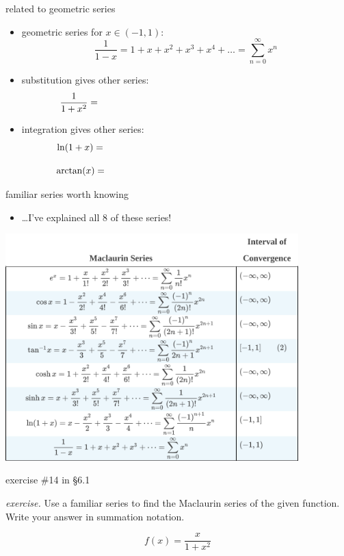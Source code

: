 \documentclass[dvipsnames,colorlinks]{beamer}
\begin{document}
\begin{frame}{related to geometric series}

\begin{itemize}
\item geometric series for $x\in(-1,1)$:
    $$\frac{1}{1-x} = 1 + x + x^2 + x^3 + x^4 + \dots = \sum_{n=0}^\infty x^n$$
\item substitution gives other series:
   $$\frac{1}{1+x^2} = \hspace{80mm}$$

\bigskip
\item integration gives other series:
   $$\ln(1+x) = \hspace{80mm}$$

   $$\arctan(x) = \hspace{80mm}$$

\bigskip
\end{itemize}
\end{frame}


\begin{frame}{familiar series worth knowing}

\begin{itemize}
\item \dots I've explained all 8 of these series!
\end{itemize}


\hspace{10mm}\includegraphics[width=0.85\textwidth]{figs/familiarseries}
\end{frame}


\begin{frame}{exercise \#14 in \S 6.1}

\noindent \emph{exercise.}  Use a familiar series to find the Maclaurin series of the given function.  Write your answer in summation notation.

$$f(x)=\frac{x}{1+x^2}$$

\vspace{50mm}
\end{frame}
\end{document}
